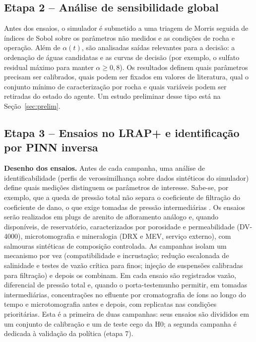 \documentclass[11pt,a4paper]{article}
\begin{document}
\subsection{Etapa 2 -- Análise de sensibilidade global}
Antes dos ensaios, o simulador é submetido a uma triagem de Morris \cite{morris1991}
seguida de índices de Sobol \cite{sobol2001} sobre os parâmetros não medidos e as
condições de rocha e operação. Além de $\alpha(t)$, são analisadas saídas relevantes para
a decisão: a ordenação de águas candidatas e as curvas de decisão (por exemplo, o
sulfato residual máximo para manter $\alpha \ge 0{,}8$). Os resultados definem quais
parâmetros precisam ser calibrados, quais podem ser fixados em valores de literatura,
qual o conjunto mínimo de caracterização por rocha e quais variáveis podem ser
retiradas do estado do agente. Um estudo preliminar desse tipo está na
Seção~\ref{sec:prelim}.

\subsection{Etapa 3 -- Ensaios no LRAP+ e identificação por PINN inversa}
\textbf{Desenho dos ensaios.} Antes de cada campanha, uma análise de identificabilidade
(perfis de verossimilhança sobre dados sintéticos do simulador) define quais medições
distinguem os parâmetros de interesse. Sabe-se, por exemplo, que a queda de pressão total
não separa o coeficiente de filtração do coeficiente de dano, o que exige tomadas de
pressão intermediárias \cite{bedrikovetsky2001}. Os ensaios serão realizados em plugs de
arenito de afloramento análogo e, quando disponíveis, de reservatório, caracterizados por
porosidade e permeabilidade (DV-4000), microtomografia e mineralogia (DRX e MEV, serviço
externo), com salmouras sintéticas de composição controlada. As campanhas isolam um
mecanismo por vez (compatibilidade e incrustação; redução escalonada de salinidade e
testes de vazão crítica para finos; injeção de suspensões calibradas para filtração) e
depois os combinam. Em cada ensaio são registrados vazão, diferencial de pressão total e,
quando o porta-testemunho permitir, em tomadas intermediárias, concentrações no efluente por
cromatografia de íons ao longo do tempo e microtomografia antes e depois, com
replicatas nas condições prioritárias. Esta é a primeira de duas campanhas: seus ensaios
são divididos em um conjunto de calibração e um de teste cego da H0; a segunda campanha é
dedicada à validação da política (etapa 7).
\end{document}

